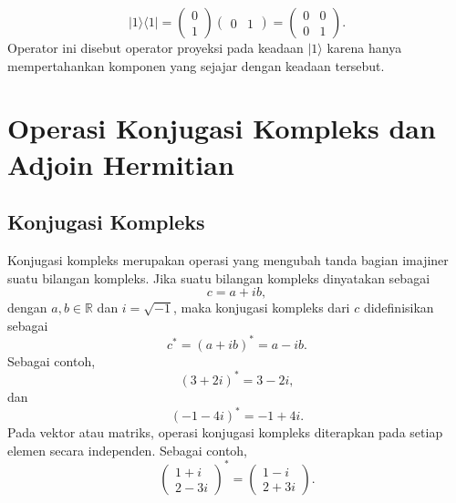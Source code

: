 \begin{equation}
\label{eq:outer_product_proyeksi}
    |1\rangle\langle1|
    =
    \begin{pmatrix}
        0 \\
        1
    \end{pmatrix}
    \begin{pmatrix}
        0 & 1
    \end{pmatrix}
    =
    \begin{pmatrix}
        0 & 0 \\
        0 & 1
    \end{pmatrix}.
\end{equation}
Operator ini disebut operator proyeksi pada keadaan $|1\rangle$ karena hanya mempertahankan komponen yang sejajar dengan keadaan tersebut.

\section{Operasi Konjugasi Kompleks dan Adjoin Hermitian}

\subsection{Konjugasi Kompleks}
Konjugasi kompleks merupakan operasi yang mengubah tanda bagian imajiner suatu bilangan kompleks. Jika suatu bilangan kompleks dinyatakan sebagai
\begin{equation}
    c = a + ib,
\end{equation}
dengan $a,b \in \mathbb{R}$ dan $i=\sqrt{-1}$, maka konjugasi kompleks dari $c$ didefinisikan sebagai
\begin{equation}
\label{eq:complex_conjugate_def}
    c^{*} = (a+ib)^{*} = a-ib.
\end{equation}
Sebagai contoh,
\begin{equation}
    (3+2i)^* = 3-2i,
\end{equation}
dan
\begin{equation}
    (-1-4i)^* = -1+4i.
\end{equation}
Pada vektor atau matriks, operasi konjugasi kompleks diterapkan pada setiap elemen secara independen. Sebagai contoh,
\begin{equation}
    \begin{pmatrix}
        1+i \\
        2-3i
    \end{pmatrix}^{*}
    =
    \begin{pmatrix}
        1-i \\
        2+3i
    \end{pmatrix}.
\end{equation}

